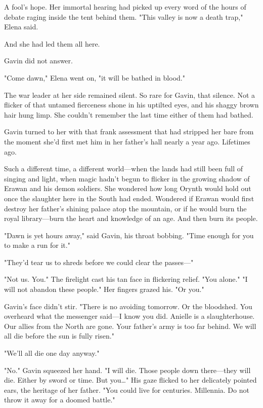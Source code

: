 A fool's hope. Her immortal hearing had picked up every word of the hours of debate raging inside the tent behind them. "This valley is now a death trap," Elena said.

And she had led them all here.

Gavin did not answer.

"Come dawn," Elena went on, "it will be bathed in blood."

The war leader at her side remained silent. So rare for Gavin, that silence. Not a flicker of that untamed fierceness shone in his uptilted eyes, and his shaggy brown hair hung limp. She couldn't remember the last time either of them had bathed.

Gavin turned to her with that frank assessment that had stripped her bare from the moment she'd first met him in her father's hall nearly a year ago. Lifetimes ago.

Such a different time, a different world---when the lands had still been full of singing and light, when magic hadn't begun to flicker in the growing shadow of Erawan and his demon soldiers. She wondered how long Orynth would hold out once the slaughter here in the South had ended. Wondered if Erawan would first destroy her father's shining palace atop the mountain, or if he would burn the royal library---burn the heart and knowledge of an age. And then burn its people.

"Dawn is yet hours away," said Gavin, his throat bobbing. "Time enough for you to make a run for it."

"They'd tear us to shreds before we could clear the passes---"

"Not us. You." The firelight cast his tan face in flickering relief. "You alone." "I will not abandon these people." Her fingers grazed his. "Or you."

Gavin's face didn't stir. "There is no avoiding tomorrow. Or the bloodshed. You overheard what the messenger said---I know you did. Anielle is a slaughterhouse. Our allies from the North are gone. Your father's army is too far behind. We will all die before the sun is fully risen."

"We'll all die one day anyway."

"No." Gavin squeezed her hand. "I will die. Those people down there---they will die. Either by sword or time. But you\ldots" His gaze flicked to her delicately pointed ears, the heritage of her father. "You could live for centuries. Millennia. Do not throw it away for a doomed battle."

